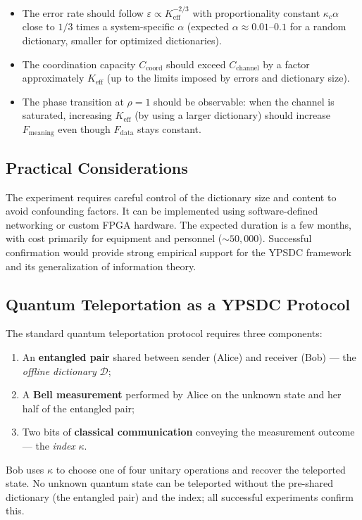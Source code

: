 \documentclass[12pt,a4paper]{article}
\theoremstyle{remark}
\newcommand{\Keff}{K_{\mathrm{eff}}}
\begin{document}
	\begin{itemize}
		\item The error rate should follow $\varepsilon \propto K_{\mathrm{eff}}^{-2/3}$ with proportionality constant $\kappa_c \alpha$ close to $1/3$ times a system-specific $\alpha$ (expected $\alpha \approx 0.01$--$0.1$ for a random dictionary, smaller for optimized dictionaries).
		\item The coordination capacity $C_{\text{coord}}$ should exceed $C_{\text{channel}}$ by a factor approximately $\Keff$ (up to the limits imposed by errors and dictionary size).
		\item The phase transition at $\rho=1$ should be observable: when the channel is saturated, increasing $\Keff$ (by using a larger dictionary) should increase $F_{\text{meaning}}$ even though $F_{\text{data}}$ stays constant.
	\end{itemize}
	
	\subsection{Practical Considerations}
	
	The experiment requires careful control of the dictionary size and content to avoid confounding factors. It can be implemented using software-defined networking or custom FPGA hardware. The expected duration is a few months, with cost primarily for equipment and personnel ($\sim 50,000$). Successful confirmation would provide strong empirical support for the YPSDC framework and its generalization of information theory.
	
	\subsection{Quantum Teleportation as a YPSDC Protocol}
	\label{subsec:qt}
	
	The standard quantum teleportation protocol requires three components:
	\begin{enumerate}
		\item An \textbf{entangled pair} shared between sender (Alice) and receiver (Bob) --- the \emph{offline dictionary} $\mathcal{D}$;
		\item A \textbf{Bell measurement} performed by Alice on the unknown state and her half of the entangled pair;
		\item Two bits of \textbf{classical communication} conveying the measurement outcome --- the \emph{index} $\kappa$.
	\end{enumerate}
	Bob uses $\kappa$ to choose one of four unitary operations and recover the teleported state. No unknown quantum state can be teleported without the pre-shared dictionary (the entangled pair) and the index; all successful experiments confirm this. 
	
\end{document}
